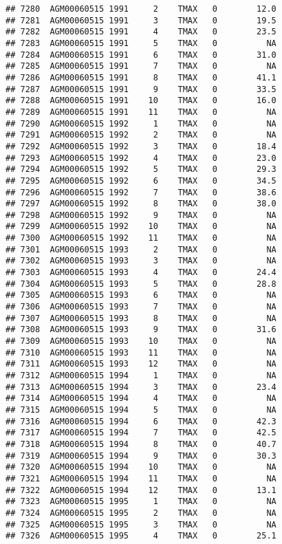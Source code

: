 \documentclass{article}\usepackage[]{graphicx}\usepackage[]{color}
\makeatletter
\newenvironment{kframe}{%
 \def\at@end@of@kframe{}%
 \ifinner\ifhmode%
  \def\at@end@of@kframe{\end{minipage}}%
  \begin{minipage}{\columnwidth}%
 \fi\fi%
 \def\FrameCommand##1{\hskip\@totalleftmargin \hskip-\fboxsep
 \colorbox{shadecolor}{##1}\hskip-\fboxsep
     \hskip-\linewidth \hskip-\@totalleftmargin \hskip\columnwidth}%
 \MakeFramed {\advance\hsize-\width
   \@totalleftmargin\z@ \linewidth\hsize
   \@setminipage}}%
 {\par\unskip\endMakeFramed%
 \at@end@of@kframe}
\newenvironment{knitrout}{}{} %
\makeatother
\begin{document}
\begin{knitrout}
\begin{kframe}
\begin{verbatim}
## 7280  AGM00060515 1991     2    TMAX   0        12.0
## 7281  AGM00060515 1991     3    TMAX   0        19.5
## 7282  AGM00060515 1991     4    TMAX   0        23.5
## 7283  AGM00060515 1991     5    TMAX   0          NA
## 7284  AGM00060515 1991     6    TMAX   0        31.0
## 7285  AGM00060515 1991     7    TMAX   0          NA
## 7286  AGM00060515 1991     8    TMAX   0        41.1
## 7287  AGM00060515 1991     9    TMAX   0        33.5
## 7288  AGM00060515 1991    10    TMAX   0        16.0
## 7289  AGM00060515 1991    11    TMAX   0          NA
## 7290  AGM00060515 1992     1    TMAX   0          NA
## 7291  AGM00060515 1992     2    TMAX   0          NA
## 7292  AGM00060515 1992     3    TMAX   0        18.4
## 7293  AGM00060515 1992     4    TMAX   0        23.0
## 7294  AGM00060515 1992     5    TMAX   0        29.3
## 7295  AGM00060515 1992     6    TMAX   0        34.5
## 7296  AGM00060515 1992     7    TMAX   0        38.6
## 7297  AGM00060515 1992     8    TMAX   0        38.0
## 7298  AGM00060515 1992     9    TMAX   0          NA
## 7299  AGM00060515 1992    10    TMAX   0          NA
## 7300  AGM00060515 1992    11    TMAX   0          NA
## 7301  AGM00060515 1993     2    TMAX   0          NA
## 7302  AGM00060515 1993     3    TMAX   0          NA
## 7303  AGM00060515 1993     4    TMAX   0        24.4
## 7304  AGM00060515 1993     5    TMAX   0        28.8
## 7305  AGM00060515 1993     6    TMAX   0          NA
## 7306  AGM00060515 1993     7    TMAX   0          NA
## 7307  AGM00060515 1993     8    TMAX   0          NA
## 7308  AGM00060515 1993     9    TMAX   0        31.6
## 7309  AGM00060515 1993    10    TMAX   0          NA
## 7310  AGM00060515 1993    11    TMAX   0          NA
## 7311  AGM00060515 1993    12    TMAX   0          NA
## 7312  AGM00060515 1994     1    TMAX   0          NA
## 7313  AGM00060515 1994     3    TMAX   0        23.4
## 7314  AGM00060515 1994     4    TMAX   0          NA
## 7315  AGM00060515 1994     5    TMAX   0          NA
## 7316  AGM00060515 1994     6    TMAX   0        42.3
## 7317  AGM00060515 1994     7    TMAX   0        42.5
## 7318  AGM00060515 1994     8    TMAX   0        40.7
## 7319  AGM00060515 1994     9    TMAX   0        30.3
## 7320  AGM00060515 1994    10    TMAX   0          NA
## 7321  AGM00060515 1994    11    TMAX   0          NA
## 7322  AGM00060515 1994    12    TMAX   0        13.1
## 7323  AGM00060515 1995     1    TMAX   0          NA
## 7324  AGM00060515 1995     2    TMAX   0          NA
## 7325  AGM00060515 1995     3    TMAX   0          NA
## 7326  AGM00060515 1995     4    TMAX   0        25.1

\end{verbatim}
\end{kframe}
\end{knitrout}
\end{document}
